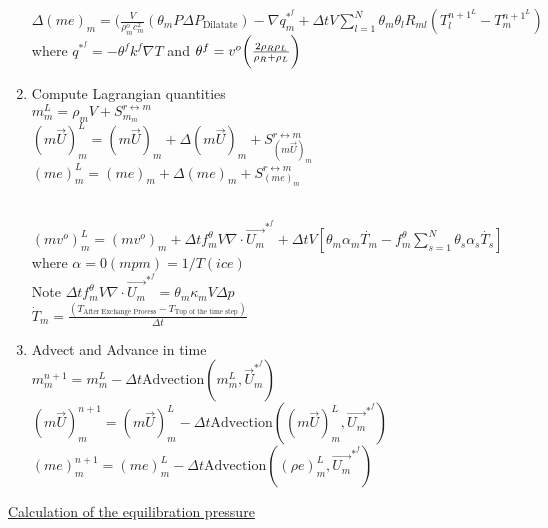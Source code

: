 \documentclass[fleqn]{article}
\newcommand{\SUM}[1]    {\ensuremath{\sum \limits_{{#1}=1}^N }}
\newcommand{\bigS}[1]   {\ensuremath{S^{r \leftrightarrow m}_{#1}}  }
\newcommand{\B}[1]      {\biggr{#1}}
\newcommand{\U}         {{\vec{U}}}
\newcommand{\rhoM}      {\ensuremath{\rho^{o}_m}}
\newcommand{\delt}      {\ensuremath{\Delta{t}} }
\newcommand{\f}         {\ensuremath{f^{\theta}_m} }
\begin{document}
\begin{enumerate}
 $\Delta(me)_m =  
    (\frac{V} {\rhoM c^2_m}(\theta_m P \Delta P_{\text{Dilatate}})
    - \nabla q_{m}^{*^f}
    + \delt V \SUM{l}  \theta_m \theta_l R_{ml}(T_l^{{n+1}^L} - T_m^{{n+1}^L} )$ \\
where $q^{*^f} = -\theta^f k^f \nabla T$ and $\theta^f = v^o \B{(}  \frac{2 \rho_R \rho_L}{\rho_R + \rho_L} \B{)}$
\newpage
\item Compute Lagrangian quantities\\
    $m^L_m     = {\rho_m}V + \bigS{m_m} $ \\
    $(m\U)^L_m = (m\U)_m + \Delta(m\U)_m + \bigS{(m\U)_m}$ \\
    $(m e)^L_m = (m e)_m + \Delta(m e)_m + \bigS{(me)_m}$\\

\\
    $(mv^o)^L_m = (mv^o)_m + \delt \f V \nabla \cdot  \vec{U_m}^{*^{f}}
                + \delt V [\theta_m \alpha_m \dot{T_m} 
                - \f \SUM{s} {\theta_s \alpha_s \dot{T_s}}]  $ \quad where $\alpha = 0 (mpm) = 1/T (ice)$  \\
    Note $\delt \f V \nabla \cdot  \vec{U_m}^{*^{f}} = \theta_m \kappa_m V \Delta{p}$\\
   $\dot T_m =\frac{ (T_{\text{After Exchange Process}} - T_{\text{Top of the time step}})}{\delt} $
\item Advect and Advance in time\\
$
    m^{n+1}_m     = m^L_m 
                  - \delt\text{Advection}(m^L_m, \U_ m^{*^{f}})$\\
$
    (m \U)^{n+1}_m = (m \U)^L_m 
                   - \delt\text{Advection}((m \U)^L_m, \vec{U_m}^{*^{f}})$\\
$
    (me)^{n+1}_m   = (me)^L_m       
                   - \delt\text{Advection}((\rho  e)^L_m, \vec{U_m}^{*^{f}})
$

\end{enumerate}
\newpage
\underline{Calculation of the equilibration pressure}
\end{document}
